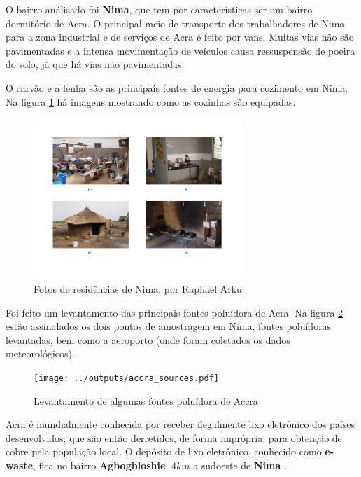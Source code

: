 O bairro análisado foi \textbf{Nima}, que tem por características
ser um bairro dormitório de Acra. O principal meio de transporte
dos trabalhadores de Nima para a zona industrial e de serviços de Acra é 
feito por vans. Muitas vias não são pavimentadas e a intensa movimentação
de veículos causa ressuspensão de poeira do solo, já que há vias não
pavimentadas.

O carvão e a lenha são as principais fontes de energia para cozimento 
em Nima. Na figura \ref{fig:nima} há imagens mostrando como as cozinhas
são equipadas. 

\begin{figure}[H]
  \centering
    \includegraphics[width=0.7\textwidth]{../inputs/images/zheng/nima.pdf}
    \caption{Fotos de residências de Nima, por Raphael Arku \label{fig:nima}}
\end{figure}

Foi feito um levantamento das principais fontes poluídora de Acra.
Na figura \ref{fg:acrasources} estão assinalados os dois pontos de 
amostragem em Nima, fontes poluídoras levantadas, bem como a aeroporto
(onde foram coletados os dados meteorológicos).

\begin{figure}[H]
  \centering
  \texttt{[image: ../outputs/accra\_sources.pdf]}
  \caption{Levantamento de algumas fontes poluídora de Accra \label{fg:acrasources}}
\end{figure}

Acra é mundialmente conhecida por receber ilegalmente lixo 
eletrônico dos países desenvolvidos, que são então derretidos, de forma
imprópria, para obtenção de cobre pela população local. 
O depósito de lixo eletrônico, conhecido como \textbf{e-waste}, 
fica no bairro \textbf{Agbogbloshie}, $4 km$ a sudoeste de \textbf{Nima}
\citep{asampong2015}.

